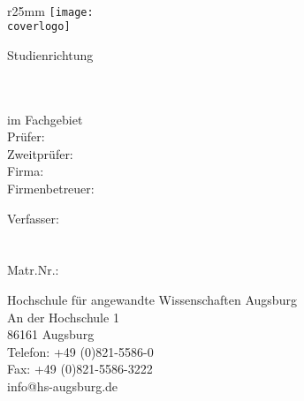 \thispagestyle{plain}
\begin{titlepage}
  \thispagestyle{empty}  
  \addtolength{\textwidth}{55mm}
  \addtolength{\oddsidemargin}{-18mm}
  
  ~
  \begin{wrapfigure}{r}{25mm}
    \vspace{-40mm}
    \texttt{[image: \\coverlogo]}
  \end{wrapfigure}
  
  
  \vspace{-1mm}
  
  \huge{\textcolor{HSAorange}{\selectfont\art}}
  
  
  \vspace{10mm}
  \Large{Studienrichtung \linebreak \studienbereich}
  \vspace{20mm}
  
  
  \begin{minipage}[t]{0.6\textwidth}
    \Large{\textbf{\titel}}\\[1.2ex]
    \large{\textbf{\untertitel}}\\
    \linebreak
    \large{im Fachgebiet \fachgebiet}\\
    \linebreak
    \linebreak
    \large{Prüfer: \pruefer}\\
    \large{Zweitprüfer: \zweitpruefer}\\
    \linebreak
    \large{Firma: \firma}\\
    \large{Firmenbetreuer: \firmenbetreuer}\\
    
  \end{minipage}
  \hspace{0.1\textwidth}
  \hspace{5mm}
  \begin{minipage}[t]{40mm}
    \scriptsize
    Verfasser:\\
    \autor\\
    \mail\\
    Matr.Nr.: \matrikelnr\\
    
    \vspace{15mm}
    
    \textcolor{HSAred}{Hochschule für angewandte Wissenschaften Augsburg}\\
    \textcolor{HSAred}{An der Hochschule 1}\\
    \textcolor{HSAred}{86161 Augsburg}\\
    \textcolor{HSAred}{Telefon: +49 (0)821-5586-0}\\
    \textcolor{HSAred}{Fax: +49 (0)821-5586-3222}\\
    \textcolor{HSAred}{info@hs-augsburg.de}\\
    
  \end{minipage}
\end{titlepage}
